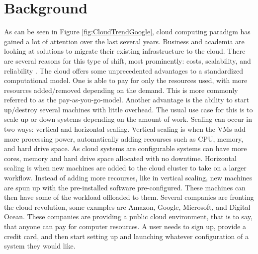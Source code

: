 \documentclass[12pt]{article}
\begin{document}
\section{Background}
As can be seen in Figure \ref{fig:CloudTrendGoogle}, cloud computing paradigm has gained a lot of attention over the last several years. Business and academia are looking at solutions to migrate their existing infrastructure to the cloud. There are several reasons for this type of shift, most prominently: costs, scalability, and reliability \cite{DillonWuChang}. The cloud offers some unprecedented advantages to a standardized computational model. One is able to pay for only the resources used, with more resources added/removed depending on the demand. This is more commonly referred to as the pay-as-you-go-model. Another advantage is the ability to start up/destroy several machines with little overhead. The usual use case for this is to scale up or down systems depending on the amount of work. Scaling can occur in two ways: vertical and horizontal scaling. Vertical scaling is when the VMs add more processing power, automatically adding recourses such as CPU, memory, and hard drive space. As cloud systems are configurable systems can have more cores, memory and hard drive space allocated with no downtime. Horizontal scaling is when new machines are added to the cloud cluster to take on a larger workflow. Instead of adding more recourses, like in vertical scaling, new machines are spun up with the pre-installed software pre-configured. These machines can then have some of the workload offloaded to them. Several companies are fronting the cloud revolution, some examples are Amazon\cite{amazonaws2017}, Google\cite{GoogleCloudCompute2017}, Microsoft\cite{Azure2017}, and Digital Ocean\cite{DigitalOcian2017}. These companies are providing a public cloud environment, that is to say, that anyone can pay for computer resources. A user needs to sign up, provide a credit card, and then start setting up and launching whatever configuration of a system they would like.
\end{document}
